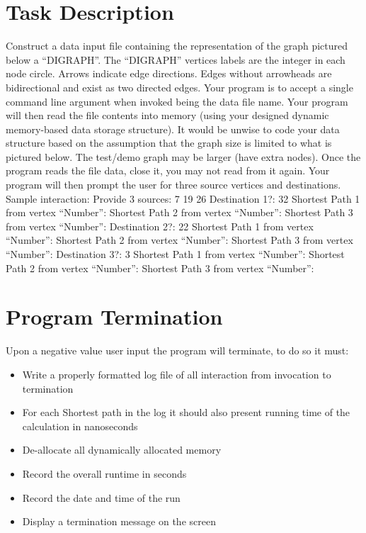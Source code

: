 \documentclass{article}
\begin{document}
\section*{Task Description}
Construct a data input file containing the representation of the graph pictured below
a “DIGRAPH”. The “DIGRAPH” vertices labels are the integer in each node circle.
Arrows indicate edge directions. Edges without arrowheads are bidirectional and exist
as two directed edges.
Your program is to accept a single command line argument when invoked being the
data file name. Your program will then read the file contents into memory (using your
designed dynamic memory-based data storage structure). It would be unwise to code
your data structure based on the assumption that the graph size is limited to what is
pictured below. The test/demo graph may be larger (have extra nodes).
Once the program reads the file data, close it, you may not read from it again. Your
program will then prompt the user for three source vertices and destinations. 
Sample interaction:\newline\newline
Provide 3 sources: 7 19 26\newline
Destination 1?: 32\newline
Shortest Path 1 from vertex “Number”:\newline
Shortest Path 2 from vertex “Number”:\newline
Shortest Path 3 from vertex “Number”:\newline\newline
Destination 2?: 22\newline
Shortest Path 1 from vertex “Number”:\newline
Shortest Path 2 from vertex “Number”:\newline
Shortest Path 3 from vertex “Number”:\newline\newline
Destination 3?: 3\newline
Shortest Path 1 from vertex “Number”:\newline
Shortest Path 2 from vertex “Number”:\newline
Shortest Path 3 from vertex “Number”:\newline

\section*{Program Termination}
Upon a negative value user input the program will terminate, to do so it must:
\begin{itemize}
 \item Write a properly formatted log file of all interaction from invocation to termination
 \item For each Shortest path in the log it should also present running time of the calculation in nanoseconds
 \item De-allocate all dynamically allocated memory
 \item Record the overall runtime in seconds
 \item Record the date and time of the run
 \item Display a termination message on the screen
\end{itemize}
\end{document}
